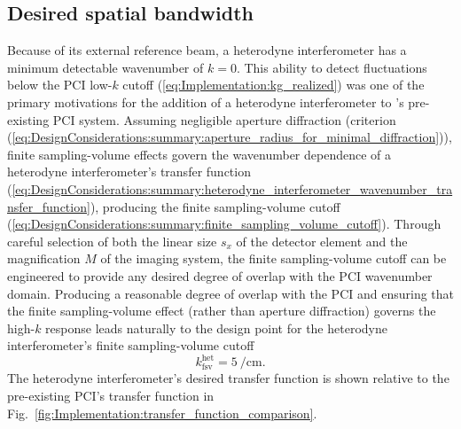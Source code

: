 \subsection{Desired spatial bandwidth}
\label{sec:Implementation:OpticalLayout:spatial_bandwidth}
Because of its external reference beam, a heterodyne interferometer
has a minimum detectable wavenumber of $k = 0$.
This ability to detect fluctuations
below the PCI low-$k$ cutoff (\ref{eq:Implementation:kg_realized})
was one of the primary motivations
for the addition of a heterodyne interferometer
to \diiid's pre-existing PCI system.
Assuming negligible aperture diffraction
(criterion (\ref{eq:DesignConsiderations:summary:aperture_radius_for_minimal_diffraction})),
finite sampling-volume effects govern the wavenumber dependence
of a heterodyne interferometer's transfer function
(\ref{eq:DesignConsiderations:summary:heterodyne_interferometer_wavenumber_transfer_function}),
producing the finite sampling-volume cutoff
(\ref{eq:DesignConsiderations:summary:finite_sampling_volume_cutoff}).
Through careful selection of both
the linear size $s_x$ of the detector element
and the magnification $M$ of the imaging system,
the finite sampling-volume cutoff can be engineered
to provide any desired degree of overlap
with the PCI wavenumber domain.
Producing a reasonable degree of overlap with the PCI and
ensuring that the finite sampling-volume effect
(rather than aperture diffraction)
governs the high-$k$ response
leads naturally to the design point for
the heterodyne interferometer's finite sampling-volume cutoff
\begin{equation}
  k_{\text{fsv}}^{\text{het}} = \SI{5}{\per\centi\meter}.
  \label{eq:Implementation:kfsv_interferometer_design}
\end{equation}
The heterodyne interferometer's desired transfer function
is shown relative to the pre-existing PCI's transfer function in
Fig.~\ref{fig:Implementation:transfer_function_comparison}.

